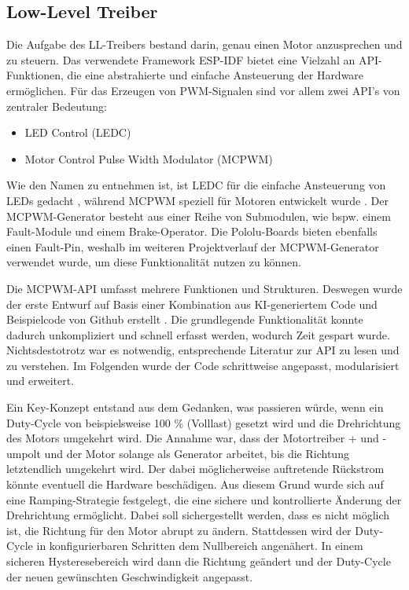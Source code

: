 \subsection{Low-Level Treiber}

Die Aufgabe des LL-Treibers bestand darin, genau einen Motor anzusprechen und zu steuern. Das verwendete Framework ESP-IDF bietet eine Vielzahl an API-Funktionen, die eine abstrahierte und einfache Ansteuerung der Hardware ermöglichen. Für das Erzeugen von PWM-Signalen sind vor allem zwei API's von zentraler Bedeutung:

\begin{itemize}
    \item LED Control (LEDC)
    \item Motor Control Pulse Width Modulator (MCPWM)
\end{itemize}

Wie den Namen zu entnehmen ist, ist LEDC für die einfache Ansteuerung von LEDs gedacht \cite{esp32_ledc}, während MCPWM speziell für Motoren entwickelt wurde \cite{esp32_mcpwm}. Der MCPWM-Generator besteht aus einer Reihe von Submodulen, wie bspw. einem Fault-Module und einem Brake-Operator. Die Pololu-Boards bieten ebenfalls einen Fault-Pin, weshalb im weiteren Projektverlauf der MCPWM-Generator verwendet wurde, um diese Funktionalität nutzen zu können. \newline

Die MCPWM-API umfasst mehrere Funktionen und Strukturen. Deswegen wurde der erste Entwurf auf Basis einer Kombination aus KI-generiertem Code und Beispielcode von Github erstellt \cite{esp32_mcpwm_example}. Die grundlegende Funktionalität konnte dadurch unkompliziert und schnell erfasst werden, wodurch Zeit gespart wurde. Nichtsdestotrotz war es notwendig, entsprechende Literatur zur API zu lesen und zu verstehen. Im Folgenden wurde der Code schrittweise angepasst, modularisiert und erweitert. \newline

Ein Key-Konzept entstand aus dem Gedanken, was passieren würde, wenn ein Duty-Cycle von beispielsweise 100 \% (Volllast) gesetzt wird und die Drehrichtung des Motors umgekehrt wird. Die Annahme war, dass der Motortreiber + und - umpolt und der Motor solange als Generator arbeitet, bis die Richtung letztendlich umgekehrt wird. Der dabei möglicherweise auftretende Rückstrom könnte eventuell die Hardware beschädigen. Aus diesem Grund wurde sich auf eine Ramping-Strategie festgelegt, die eine sichere und kontrollierte Änderung der Drehrichtung ermöglicht. Dabei soll sichergestellt werden, dass es nicht möglich ist, die Richtung für den Motor abrupt zu ändern. Stattdessen wird der Duty-Cycle in konfigurierbaren Schritten dem Nullbereich angenähert. In einem sicheren Hysteresebereich wird dann die Richtung geändert und der Duty-Cycle der neuen gewünschten Geschwindigkeit angepasst. \newline

